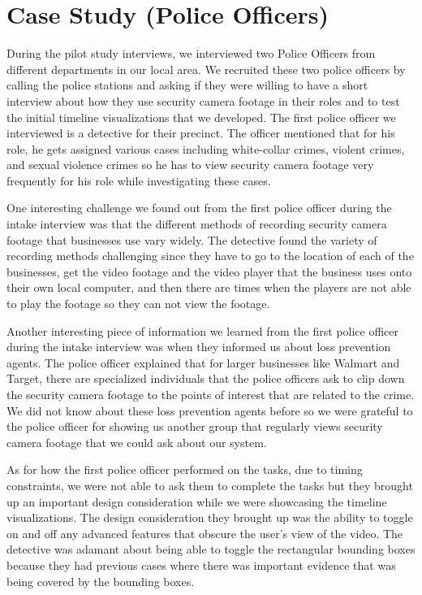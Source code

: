 \documentclass[doublespace,draft,nopageskip]{VTthesis} %
\begin{document}
\section{Case Study (Police Officers)} \label{se:one_section}
During the pilot study interviews, we interviewed two Police Officers from different departments in our local area. We recruited these two police officers by calling the police stations and asking if they were willing to have a short interview about how they use security camera footage in their roles and to test the initial timeline visualizations that we developed. The first police officer we interviewed is a detective for their precinct. The officer mentioned that for his role, he gets assigned various cases including white-collar crimes, violent crimes, and sexual violence crimes so he has to view security camera footage very frequently for his role while investigating these cases.

One interesting challenge we found out from the first police officer during the intake interview was that the different methods of recording security camera footage that businesses use vary widely. The detective found the variety of recording methods challenging since they have to go to the location of each of the businesses, get the video footage and the video player that the business uses onto their own local computer, and then there are times when the players are not able to play the footage so they can not view the footage. 

Another interesting piece of information we learned from the first police officer during the intake interview was when they informed us about loss prevention agents. The police officer explained that for larger businesses like Walmart and Target, there are specialized individuals that the police officers ask to clip down the security camera footage to the points of interest that are related to the crime. We did not know about these loss prevention agents before so we were grateful to the police officer for showing us another group that regularly views security camera footage that we could ask about our system.

As for how the first police officer performed on the tasks, due to timing constraints, we were not able to ask them to complete the tasks but they brought up an important design consideration while we were showcasing the timeline visualizations. The design consideration they brought up was the ability to toggle on and off any advanced features that obscure the user's view of the video. The detective was adamant about being able to toggle the rectangular bounding boxes because they had previous cases where there was important evidence that was being covered by the bounding boxes.
\end{document}
